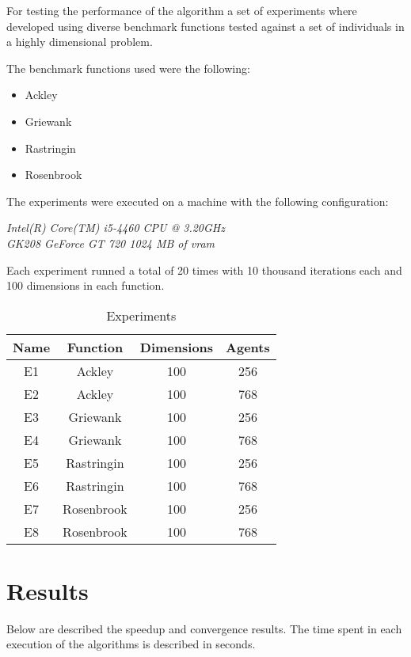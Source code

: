 \documentclass[conference]{IEEEtran}
\begin{document}
For testing the performance of the algorithm a set of experiments where
developed using diverse benchmark functions tested against a set of
individuals in a highly dimensional problem.

The benchmark functions used were the following:

\begin{itemize}
    \item Ackley
    \item Griewank
    \item Rastringin
    \item Rosenbrook
\end{itemize}

The experiments were executed on a machine with the following configuration:

\textit{Intel(R) Core(TM) i5-4460  CPU @ 3.20GHz \\ GK208 GeForce GT 720 1024 MB of vram}

Each experiment runned a total of 20 times with 10 thousand iterations each and 100 dimensions in each function.

\begin{table}[!htbp]
    \renewcommand{\arraystretch}{1.3}
    \caption{Experiments}
    \label{experiments}
    \centering
    \begin{tabular}{c|c|c|c}
    \hline
        \bf Name & Function &  Dimensions & Agents\\
    \hline
        E1 & Ackley & 100 & 256\\
        E2 & Ackley & 100 & 768\\
        E3 & Griewank & 100 & 256\\
        E4 & Griewank & 100 & 768\\
        E5 & Rastringin & 100 & 256\\
        E6 & Rastringin & 100 & 768\\
        E7 & Rosenbrook & 100 & 256\\
        E8 & Rosenbrook & 100 & 768\\
    \end{tabular}
\end{table}

\section{Results}

Below are described the speedup and convergence results. The time spent in each execution of the algorithms is described in seconds.
\end{document}
